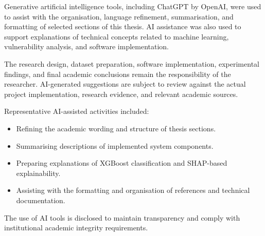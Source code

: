 \documentclass[
]{article}
\begin{document}
Generative artificial intelligence tools, including ChatGPT by OpenAI,
were used to assist with the organisation, language refinement,
summarisation, and formatting of selected sections of this thesis. AI
assistance was also used to support explanations of technical concepts
related to machine learning, vulnerability analysis, and software
implementation.

The research design, dataset preparation, software implementation,
experimental findings, and final academic conclusions remain the
responsibility of the researcher. AI-generated suggestions are subject
to review against the actual project implementation, research evidence,
and relevant academic sources.

Representative AI-assisted activities included:

\begin{itemize}
\item
  Refining the academic wording and structure of thesis sections.
\item
  Summarising descriptions of implemented system components.
\item
  Preparing explanations of XGBoost classification and SHAP-based
  explainability.
\item
  Assisting with the formatting and organisation of references and
  technical documentation.
\end{itemize}

The use of AI tools is disclosed to maintain transparency and comply
with institutional academic integrity requirements.
\end{document}
